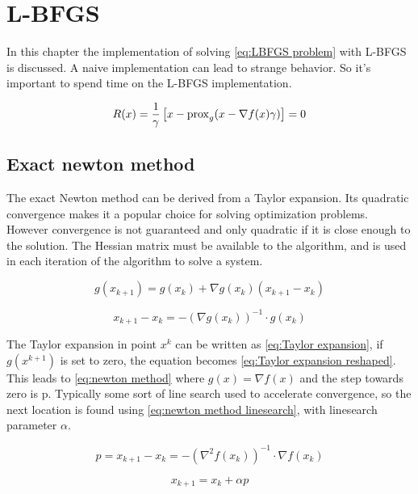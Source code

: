 \chapter{L-BFGS}
	In this chapter the implementation of solving \eqref{eq:LBFGS problem} with L-BFGS is discussed. A naive implementation can lead to strange behavior. So it's important to spend time on the L-BFGS implementation.
	
	
	\begin{equation}
	R(x) = \frac{1}{\gamma}\left[ x - \operatorname{prox}_g( x - \nabla f(x)\gamma) \right] = 0
	\label{eq:LBFGS problem}
	\end{equation}
	
	\section{Exact newton method}
	The exact Newton method can be derived from a Taylor expansion. Its quadratic convergence makes it a popular choice for solving optimization problems. However convergence is not guaranteed and only quadratic if it is close enough to the solution. The Hessian matrix must be available to the algorithm, and is used in each iteration of the algorithm to solve a system.
	
		\begin{equation}
			g(x_{k+1}) = g(x_k) + \nabla g(x_k)(x_{k+1}-x_k)
			\label{eq:Taylor expansion}
		\end{equation}
		
		\begin{equation}
			x_{k+1}-x_k = -(\nabla g(x_k))^{-1} \cdot g(x_k)
			\label{eq:Taylor expansion reshaped}
		\end{equation}
		
	The Taylor expansion in point $x^k$ can be written as \eqref{eq:Taylor expansion}, if $g(x^{k+1})$ is set to zero, the equation becomes \eqref{eq:Taylor expansion reshaped}. This leads to \eqref{eq:newton method} where $g(x)=\nabla f(x)$ and the step towards zero is p. Typically some sort of line search used to accelerate convergence, so the next location is found using \eqref{eq:newton method linesearch}, with linesearch parameter $\alpha$.	
	
		\begin{equation}
			p = x_{k+1}-x_k = -(\nabla^2 f(x_k))^{-1} \cdot \nabla f(x_k)
			\label{eq:newton method}	
		\end{equation}
	
		\begin{equation}
		 	x_{k+1} = x_k + \alpha p
		 	\label{eq:newton method linesearch}
		\end{equation}
		
